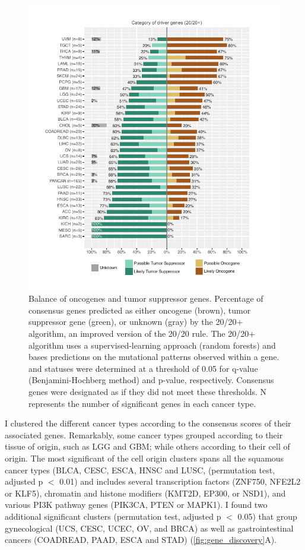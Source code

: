 \begin{figure}
  \centering
  \makeatletter
  \let\@currsize\normalsize
  \includegraphics[width=0.9\linewidth]{figures/chapter7/og_tsg_balance.pdf}
  \caption[Balance of oncogenes and tumor suppressor genes.]{Balance of oncogenes and tumor suppressor genes. Percentage of consensus genes predicted as either oncogene (brown), tumor suppressor gene (green), or unknown (gray) by the 20/20+ algorithm, an improved version of the 20/20 rule. The 20/20+ algorithm uses a supervised-learning approach (random forests) and bases predictions on the mutational patterns observed within a gene.  and  statuses were determined at a threshold of 0.05 for q-value (Benjamini-Hochberg method) and p-value, respectively. Consensus genes were designated as  if they did not meet these thresholds. N represents the number of significant genes in each cancer type.}
  \label{fig:og_tsg_balance}
\end{figure}

I clustered the different cancer types according to the consensus scores of their associated genes. Remarkably, some cancer types grouped according to their tissue of origin, such as LGG and GBM; while others according to their cell of origin. The most significant of the cell origin clusters spans all the squamous cancer types (BLCA, CESC, ESCA, HNSC and LUSC, (permutation test, adjusted p $<$ 0.01) and includes several transcription factors (ZNF750, NFE2L2 or KLF5), chromatin and histone modifiers (KMT2D, EP300, or NSD1), and various PI3K pathway genes (PIK3CA, PTEN or MAPK1). I found two additional significant clusters (permutation test, adjusted p $<$ 0.05) that group gynecological (UCS, CESC, UCEC, OV, and BRCA) as well as gastrointestinal cancers (COADREAD, PAAD, ESCA and STAD) (\autoref{fig:gene_discovery}A). 

